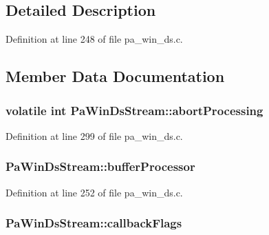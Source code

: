 \subsection{Detailed Description}


Definition at line 248 of file pa\+\_\+win\+\_\+ds.\+c.



\subsection{Member Data Documentation}
\subsubsection[{\texorpdfstring{abort\+Processing}{abortProcessing}}]{\setlength{\rightskip}{0pt plus 5cm}volatile {\bf int} Pa\+Win\+Ds\+Stream\+::abort\+Processing}\hypertarget{struct_pa_win_ds_stream_a1e257d85cd266dcd5ea68b9b6490ec43}{}\label{struct_pa_win_ds_stream_a1e257d85cd266dcd5ea68b9b6490ec43}


Definition at line 299 of file pa\+\_\+win\+\_\+ds.\+c.

\subsubsection[{\texorpdfstring{buffer\+Processor}{bufferProcessor}}]{ Pa\+Win\+Ds\+Stream\+::buffer\+Processor}\hypertarget{struct_pa_win_ds_stream_a9c2310a757d9246b054f6bb66e408806}{}\label{struct_pa_win_ds_stream_a9c2310a757d9246b054f6bb66e408806}


Definition at line 252 of file pa\+\_\+win\+\_\+ds.\+c.

\subsubsection[{\texorpdfstring{callback\+Flags}{callbackFlags}}]{ Pa\+Win\+Ds\+Stream\+::callback\+Flags}\hypertarget{struct_pa_win_ds_stream_a6393a1062d8467feeb9145e88a3b576f}{}\label{struct_pa_win_ds_stream_a6393a1062d8467feeb9145e88a3b576f}



